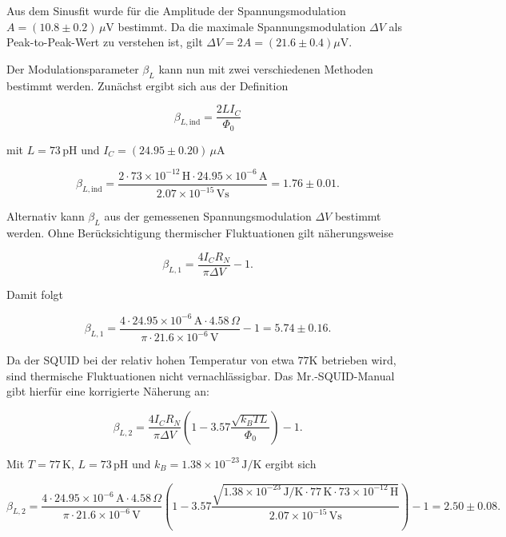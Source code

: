 \documentclass{article}
\begin{document}
Aus dem Sinusfit wurde für die Amplitude der Spannungsmodulation $A = (10.8 \pm 0.2)\,\mu\mathrm{V}$ bestimmt. Da die maximale Spannungsmodulation $\Delta V$ als Peak-to-Peak-Wert zu verstehen ist, gilt $\Delta V = 2A = (21.6 \pm 0.4)\mu\mathrm{V}$.

Der Modulationsparameter $\beta_L$ kann nun mit zwei verschiedenen Methoden bestimmt werden. Zunächst ergibt sich aus der Definition

\begin{equation}
    \beta_{L,\mathrm{ind}}
    = \frac{2LI_C}{\Phi_0}
\end{equation}

mit $L=73\,\mathrm{pH}$ und $I_C=(24.95\pm0.20)\,\mu\mathrm{A}$

\begin{equation}
    \beta_{L,\mathrm{ind}}
    = \frac{2\cdot 73\times 10^{-12}\,\mathrm{H}\cdot 24.95\times 10^{-6}\,\mathrm{A}}
    {2.07\times 10^{-15}\,\mathrm{Vs}}
    = 1.76 \pm 0.01.
\end{equation}

Alternativ kann $\beta_L$ aus der gemessenen Spannungsmodulation $\Delta V$ bestimmt werden. Ohne Berücksichtigung thermischer Fluktuationen gilt näherungsweise

\begin{equation}
    \beta_{L,1}
    = \frac{4I_C R_N}{\pi \Delta V} - 1.
\end{equation}

Damit folgt

\begin{equation}
    \beta_{L,1}
    = \frac{4\cdot 24.95\times10^{-6}\,\mathrm{A}\cdot 4.58\,\Omega}
    {\pi\cdot 21.6\times10^{-6}\,\mathrm{V}} - 1
    = 5.74 \pm 0.16.
\end{equation}

Da der SQUID bei der relativ hohen Temperatur von etwa $77\mathrm{K}$ betrieben wird, sind thermische Fluktuationen nicht vernachlässigbar. Das Mr.-SQUID-Manual \cite{mr_squid} gibt hierfür eine korrigierte Näherung an:

\begin{equation}
    \beta_{L,2}
    =
    \frac{4I_C R_N}{\pi \Delta V}
    \left(
    1 - 3.57\frac{\sqrt{k_BTL}}{\Phi_0}
    \right)
    - 1.
\end{equation}

Mit $T=77\,\mathrm{K}$, $L=73\,\mathrm{pH}$ und $k_B=1.38\times10^{-23}\,\mathrm{J/K}$ ergibt sich

\begin{equation}
    \beta_{L,2}
    =
    \frac{4\cdot 24.95\times10^{-6}\,\mathrm{A}\cdot 4.58\,\Omega}
    {\pi\cdot 21.6\times10^{-6}\,\mathrm{V}}
    \left(
    1 - 3.57
    \frac{\sqrt{1.38\times10^{-23}\,\mathrm{J/K}\cdot 77\,\mathrm{K}\cdot 73\times10^{-12}\,\mathrm{H}}}
    {2.07\times10^{-15}\,\mathrm{Vs}}
    \right)
    - 1
    = 2.50 \pm 0.08.
\end{equation}
\end{document}
